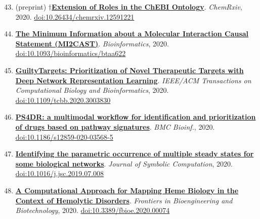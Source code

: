 \documentclass[10pt,a4paper,sans]{moderncv} %
\newcommand{\wikidata}[2]{\href{https://bioregistry.io/wikidata:#1?provider=scholia}{{#2}}}
\begin{document}
    \begin{enumerate}
    \setcounter{enumi}{42}
    \itemsep0.5em
        \item
        (preprint) $\dagger$\wikidata{Q96909013}{\textbf{Extension of Roles in the ChEBI Ontology}}.
    \textit{ChemRxiv}, 2020.  {\scriptsize \href{https://bioregistry.io/doi:10.26434/CHEMRXIV.12591221}{doi:10.26434/chemrxiv.12591221}}
        \item
        \wikidata{Q97063807}{\textbf{The Minimum Information about a Molecular Interaction Causal Statement (MI2CAST)}}.
    \textit{Bioinformatics}, 2020.  {\scriptsize \href{https://bioregistry.io/doi:10.1093/BIOINFORMATICS/BTAA622}{doi:10.1093/bioinformatics/btaa622}}
        \item
        \wikidata{Q98200725}{\textbf{GuiltyTargets: Prioritization of Novel Therapeutic Targets with Deep Network Representation Learning}}.
    \textit{IEEE/ACM Transactions on Computational Biology and Bioinformatics}, 2020.  {\scriptsize \href{https://bioregistry.io/doi:10.1109/TCBB.2020.3003830}{doi:10.1109/tcbb.2020.3003830}}
        \item
        \wikidata{Q96169295}{\textbf{PS4DR: a multimodal workflow for identification and prioritization of drugs based on pathway signatures}}.
    \textit{BMC Bioinf.}, 2020.  {\scriptsize \href{https://bioregistry.io/doi:10.1186/S12859-020-03568-5}{doi:10.1186/s12859-020-03568-5}}
        \item
        \wikidata{Q118952373}{\textbf{Identifying the parametric occurrence of multiple steady states for some biological networks}}.
    \textit{Journal of Symbolic Computation}, 2020.  {\scriptsize \href{https://bioregistry.io/doi:10.1016/J.JSC.2019.07.008}{doi:10.1016/j.jsc.2019.07.008}}
        \item
        \wikidata{Q90643177}{\textbf{A Computational Approach for Mapping Heme Biology in the Context of Hemolytic Disorders}}.
    \textit{Frontiers in Bioengineering and Biotechnology}, 2020.  {\scriptsize \href{https://bioregistry.io/doi:10.3389/FBIOE.2020.00074}{doi:10.3389/fbioe.2020.00074}}
    \end{enumerate}
\end{document}
